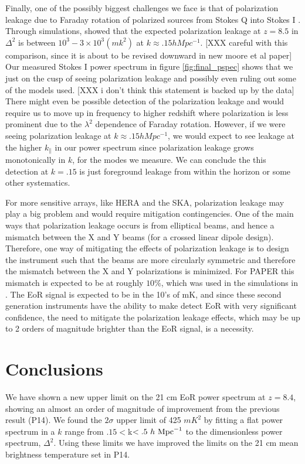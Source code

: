 \documentclass[twocolumn,numberedappendix]{emulateapj} \shorttitle{PSA64}
\begin{document}
Finally, one of the possibly biggest challenges we face is that of polarization
leakage due to Faraday rotation of polarized sources from Stokes Q into Stokes
I \citep{jelic_et_al2010,jelic_et_al2014}. 
Through simulations, \cite{moore_et_al2013} showed that the expected
polarization leakage at $z=8.5$ in $\Delta^{2}$ is between
$10^{3}-3\times10^{3} (mk^{2})$ at $k\approx{.15}hMpc^{-1}$. 
[XXX careful with this comparison, since it is about to be revised downward in new moore et al paper]
Our measured Stokes
I power spectrum in figure \ref{fig:final_pspec} shows that we just on the cusp
of seeing polarization leakage and possibly even ruling out some of the models
used. [XXX i don't think this statement is backed up by the data]
There might even be possible detection of the polarization leakage and
would require us to move up in frequency to higher redshift where polarization
is less prominent due to the $\lambda^{2}$ dependence of Faraday rotation.
However, if we were seeing polarization leakage at $k\approx{.15}hMpc^{-1}$, we
would expect to see leakage at the higher $k_{\parallel}$ in our power spectrum
since polarization leakage grows monotonically in $k$, for the modes we measure.
We can conclude the this detection at $k=.15$ is just foreground leakage from
within the horizon or some other systematics.

For more sensitive arrays, like HERA and the SKA, polarization leakage may play
a big problem and would require mitigation contingencies. One of the main ways
that polarization leakage occurs is from elliptical beams, and hence a mismatch
between the X and Y beams (for a crossed linear dipole design). Therefore, one
way of mitigating the effects of polarization leakage is to design the
instrument such that the beams are more circularly symmetric and therefore the
mismatch between the X and Y polarizations is minimized. For PAPER this mismatch
is expected to be at roughly $10\%$, which was used in the simulations in
\cite{moore_et_al2013}.  The EoR signal is expected to be in the 10's of mK, and
since these second generation instruments have the ability to make detect EoR
with very significant confidence, the need to mitigate the polarization leakage
effects, which may be up to 2 orders of magnitude brighter than the EoR signal,
is a necessity.

\section{Conclusions}\label{sec:conclusion}
We have shown a new upper limit on the 21 cm EoR power spectrum at $z=8.4$,
showing an almost an order of magnitude of improvement from the previous result (P14).
We found the $2\sigma$ upper limit of 425 $mK^{2}$ by fitting a
flat power spectrum in a $k$ range from $.15<$k$<.5\ h\ {\rm Mpc}^{-1}$ to the
dimensionless power spectrum, $\Delta^{2}$. Using these limits we have improved
the limits on the 21 cm mean brightness temperature set in P14.
\end{document}
